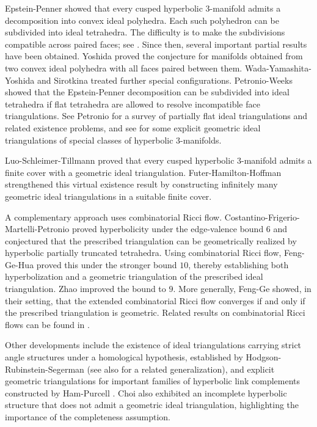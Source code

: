 \documentclass[oneside,a4paper,12pt]{article}
\theoremstyle{plain}
\theoremstyle{definition}
\theoremstyle{remark}
\numberwithin{equation}{section}
\begin{document}
Epstein-Penner \cite{EP} showed that every cusped hyperbolic 3-manifold admits a decomposition into convex ideal polyhedra. Each such polyhedron can be subdivided into
ideal tetrahedra. The difficulty is to make the subdivisions compatible across paired faces; see \cite{KirbyK3,FHH}. Since then, several important partial results have been obtained. Yoshida \cite{Yoshida} proved the conjecture for manifolds obtained from two convex ideal polyhedra with all faces paired between them. Wada-Yamashita-Yoshida \cite{WYY} and Sirotkina \cite{Sirotkina} treated further special configurations. Petronio-Weeks \cite{PW} showed that the Epstein-Penner decomposition can be subdivided into ideal tetrahedra if flat tetrahedra are allowed to resolve incompatible face triangulations. See Petronio \cite{Petronio} for a survey of partially flat ideal triangulations and related existence problems, and see \cite{Gue1,Lackenby,Nim} for some explicit geometric ideal triangulations of special classes of hyperbolic 3-manifolds.

Luo-Schleimer-Tillmann \cite{LST} proved that every cusped hyperbolic $3$-manifold admits a finite cover with a geometric ideal triangulation. Futer-Hamilton-Hoffman \cite{FHH} strengthened this virtual existence result by constructing infinitely many geometric ideal triangulations in a suitable finite cover.

A complementary approach uses combinatorial Ricci flow. Costantino-Frigerio-Martelli-Petronio \cite{CFMP} proved hyperbolicity under the edge-valence bound $6$ and conjectured that the prescribed triangulation can be geometrically realized by hyperbolic partially truncated tetrahedra. Using combinatorial Ricci flow, Feng-Ge-Hua \cite{FGH} proved this under the stronger bound $10$, thereby establishing both hyperbolization and a geometric triangulation of the prescribed ideal triangulation.
Zhao \cite{Zhao} improved the bound to $9$. More generally, Feng-Ge \cite{FengGe} showed, in their setting, that the extended combinatorial Ricci flow converges if and only if the prescribed triangulation is geometric. Related results on combinatorial Ricci flows can be found in \cite{FGHX,FGM}.

Other developments include the existence of ideal triangulations carrying strict angle structures under a homological hypothesis,
established by Hodgson-Rubinstein-Segerman \cite{HRS} (see also \cite{GJZangle} for a related generalization), and explicit geometric triangulations for important families of hyperbolic link
complements constructed by Ham-Purcell \cite{HP}. Choi \cite{Choi} also exhibited an incomplete hyperbolic structure that does not admit a
geometric ideal triangulation, highlighting the importance of the completeness assumption.
\end{document}
